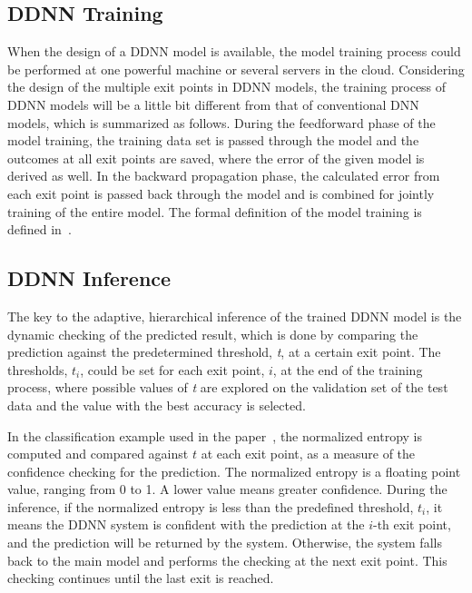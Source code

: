 \documentclass[conference]{IEEEtran}
\begin{document}
\subsection{DDNN Training}
When the design of a DDNN model is available, the model training process could be performed at one powerful machine or several servers in the cloud.  Considering the design of the multiple exit points in DDNN models, the training process of DDNN models will be a little bit different from that of conventional DNN models, which is summarized as follows. During the feedforward phase of the model training, the training data set is passed through the model and the outcomes at all exit points are saved, where the error of the given model is derived as well. In the backward propagation phase, the calculated error from each exit point is passed back through the model and is combined for jointly training of the entire model. The formal definition of the model training is defined in~\cite{Teerapittayanon17}.

\subsection{DDNN Inference}
The key to the adaptive, hierarchical inference of the trained DDNN model is the dynamic checking of the predicted result, which is done by comparing the prediction against the predetermined threshold, \emph{t}, at a certain exit point. The thresholds, $t_{i}$, could be set for each exit point, $i$, at the end of the training process, where possible values of \emph{t} are explored on the validation set of the test data and the value with the best accuracy is selected.

In the classification example used in the paper~\cite{Teerapittayanon17}, the normalized entropy is computed and compared against $t$ at each exit point, as a measure of the confidence checking for the prediction. The normalized entropy is a floating point value, ranging from 0 to 1. A lower value means greater confidence. During the inference, if the normalized entropy is less than the predefined threshold,  $t_{i}$, it means the DDNN system is confident with the prediction at the  $i$-th exit point, and the prediction will be returned by the system. Otherwise, the system falls back to the main model and performs the checking at the next exit point. This checking continues until the last exit is reached.

\end{document}
